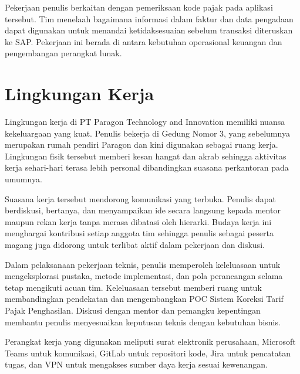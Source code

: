 Pekerjaan penulis berkaitan dengan pemeriksaan kode pajak pada aplikasi tersebut. Tim menelaah bagaimana informasi dalam faktur dan data pengadaan dapat digunakan untuk menandai ketidaksesuaian sebelum transaksi diteruskan ke SAP. Pekerjaan ini berada di antara kebutuhan operasional keuangan dan pengembangan perangkat lunak.
\section{Lingkungan Kerja} 
\label{sec:lingkungan_kerja}
Lingkungan kerja di PT Paragon Technology and Innovation memiliki nuansa kekeluargaan yang kuat. Penulis bekerja di Gedung Nomor 3, yang sebelumnya merupakan rumah pendiri Paragon dan kini digunakan sebagai ruang kerja. Lingkungan fisik tersebut memberi kesan hangat dan akrab sehingga aktivitas kerja sehari-hari terasa lebih personal dibandingkan suasana perkantoran pada umumnya.

Suasana kerja tersebut mendorong komunikasi yang terbuka. Penulis dapat berdiskusi, bertanya, dan menyampaikan ide secara langsung kepada mentor maupun rekan kerja tanpa merasa dibatasi oleh hierarki. Budaya kerja ini menghargai kontribusi setiap anggota tim sehingga penulis sebagai peserta magang juga didorong untuk terlibat aktif dalam pekerjaan dan diskusi.

Dalam pelaksanaan pekerjaan teknis, penulis memperoleh keleluasaan untuk mengeksplorasi pustaka, metode implementasi, dan pola perancangan selama tetap mengikuti acuan tim. Keleluasaan tersebut memberi ruang untuk membandingkan pendekatan dan mengembangkan POC Sistem Koreksi Tarif Pajak Penghasilan. Diskusi dengan mentor dan pemangku kepentingan membantu penulis menyesuaikan keputusan teknis dengan kebutuhan bisnis.

Perangkat kerja yang digunakan meliputi surat elektronik perusahaan, Microsoft Teams untuk komunikasi, GitLab untuk repositori kode, Jira untuk pencatatan tugas, dan VPN untuk mengakses sumber daya kerja sesuai kewenangan.
